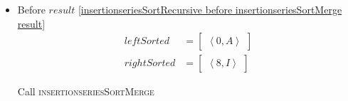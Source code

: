 \begin{frame}[containsverbatim]{\insertionseriesexampleframe}
\begin{columns}[c]
\begin{column}{0.6\textwidth}
{\begin{minipage}[c]{\textwidth}
\begin{multicols}{3}
\begin{itemize}
                                    \item Before $result$ \cref{insertionseriesSortRecursive before insertionseriesSortMerge result}
                                    \begin{align*}
                                        leftSorted & = \begin{bmatrix}\left<0, A\right>\end{bmatrix} \\
                                        rightSorted & = \begin{bmatrix}\left<8, I\right>\end{bmatrix}
                                    \end{align*}
        
                                    Call \textsc{insertionseriesSortMerge}
                                \end{itemize}
                            \end{multicols}
                        \end{minipage}
                    }
                \end{column}
            \end{columns}
        \end{frame}

